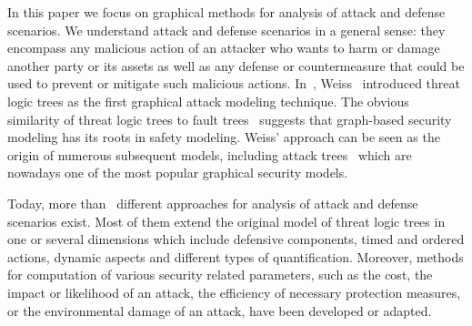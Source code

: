 \documentclass[a4paper]{article}
\begin{document}
In this paper we focus on graphical methods for analysis of attack and defense 
scenarios. We understand attack and defense scenarios in a general sense: they
encompass any malicious action of an attacker who wants to harm or damage 
another party or its assets as well as any defense or countermeasure that could
be used to prevent or mitigate such malicious actions. In~,
Weiss~\cite{Weis} introduced threat logic trees as the first graphical attack
modeling technique. The obvious similarity of threat logic trees to fault
trees~\cite{VeGoRoHa} suggests that graph-based security modeling has its roots
in safety modeling. Weiss' approach can be seen as the origin of numerous
subsequent models, including attack trees~\cite{SaSaScWa,Schn} 
which are nowadays one of the most popular graphical security models. 

Today, more than~ different approaches for analysis of attack and defense
scenarios exist. Most of them extend the original model of threat logic trees in
one or several dimensions which include defensive components, timed and ordered
actions, dynamic aspects and different types of quantification. Moreover,
methods for computation of various security related parameters, such as the
cost, the impact or likelihood of an attack, the efficiency of necessary
protection measures, or the environmental damage of an attack, have been
developed or adapted. 
\end{document}
